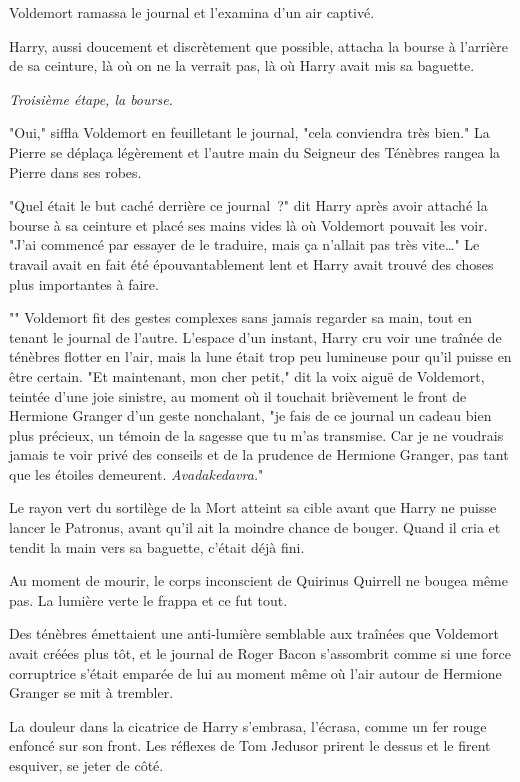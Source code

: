 Voldemort ramassa le journal et l'examina d'un air captivé.

Harry, aussi doucement et discrètement que possible, attacha la bourse à l'arrière de sa ceinture, là où on ne la verrait pas, là où Harry avait mis sa baguette.

\emph{Troisième étape, la bourse.}

"Oui," siffla Voldemort en feuilletant le journal, "cela conviendra très bien." La Pierre se déplaça légèrement et l'autre main du Seigneur des Ténèbres rangea la Pierre dans ses robes.

"Quel était le but caché derrière ce journal~?" dit Harry après avoir attaché la bourse à sa ceinture et placé ses mains vides là où Voldemort pouvait les voir. "J'ai commencé par essayer de le traduire, mais ça n'allait pas très vite…" Le travail avait en fait été épouvantablement lent et Harry avait trouvé des choses plus importantes à faire.

"" Voldemort fit des gestes complexes sans jamais regarder sa main, tout en tenant le journal de l'autre. L'espace d'un instant, Harry cru voir une traînée de ténèbres flotter en l'air, mais la lune était trop peu lumineuse pour qu'il puisse en être certain. "Et maintenant, mon cher petit," dit la voix aiguë de Voldemort, teintée d'une joie sinistre, au moment où il touchait brièvement le front de Hermione Granger d'un geste nonchalant, "je fais de ce journal un cadeau bien plus précieux, un témoin de la sagesse que tu m'as transmise. Car je ne voudrais jamais te voir privé des conseils et de la prudence de Hermione Granger, pas tant que les étoiles demeurent. \emph{Avadakedavra.}"

Le rayon vert du sortilège de la Mort atteint sa cible avant que Harry ne puisse lancer le Patronus, avant qu'il ait la moindre chance de bouger. Quand il cria et tendit la main vers sa baguette, c'était déjà fini.

Au moment de mourir, le corps inconscient de Quirinus Quirrell ne bougea même pas. La lumière verte le frappa et ce fut tout.

Des ténèbres émettaient une anti-lumière semblable aux traînées que Voldemort avait créées plus tôt, et le journal de Roger Bacon s'assombrit comme si une force corruptrice s'était emparée de lui au moment même où l'air autour de Hermione Granger se mit à trembler.

La douleur dans la cicatrice de Harry s'embrasa, l'écrasa, comme un fer rouge enfoncé sur son front. Les réflexes de Tom Jedusor prirent le dessus et le firent esquiver, se jeter de côté.

